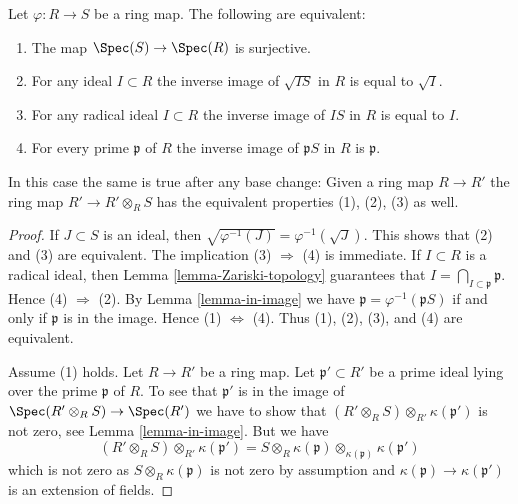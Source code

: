 \begin{lemma}
\label{lemma-surjective-spec-radical-ideal}
Let $\varphi : R \to S$ be a ring map.
The following are equivalent:
\begin{enumerate}
\item The map $\Spec(S) \to \Spec(R)$ is surjective.
\item For any ideal $I \subset R$
the inverse image of $\sqrt{IS}$ in $R$ is equal to $\sqrt{I}$.
\item For any radical ideal $I \subset R$ the inverse image
of $IS$ in $R$ is equal to $I$.
\item For every prime $\mathfrak p$ of $R$ the inverse
image of $\mathfrak p S$ in $R$ is $\mathfrak p$.
\end{enumerate}
In this case the same is true after any base change: Given a ring map
$R \to R'$ the ring map $R' \to R' \otimes_R S$ has the equivalent
properties (1), (2), (3) as well.
\end{lemma}

\begin{proof}
If $J \subset S$ is an ideal, then
$\sqrt{\varphi^{-1}(J)} = \varphi^{-1}(\sqrt{J})$. This shows that (2)
and (3) are equivalent.
The implication (3) $\Rightarrow$ (4) is immediate.
If $I \subset R$ is a radical ideal, then
Lemma \ref{lemma-Zariski-topology}
guarantees that $I = \bigcap_{I \subset \mathfrak p} \mathfrak p$.
Hence (4) $\Rightarrow$ (2). By
Lemma \ref{lemma-in-image}
we have $\mathfrak p = \varphi^{-1}(\mathfrak p S)$ if and only if
$\mathfrak p$ is in the image. Hence (1) $\Leftrightarrow$ (4).
Thus (1), (2), (3), and (4) are equivalent.

\medskip\noindent
Assume (1) holds. Let $R \to R'$ be a ring map. Let
$\mathfrak p' \subset R'$ be a prime ideal lying over the prime
$\mathfrak p$ of $R$. To see that $\mathfrak p'$ is in the image
of $\Spec(R' \otimes_R S) \to \Spec(R')$ we have to show
that $(R' \otimes_R S) \otimes_{R'} \kappa(\mathfrak p')$ is not zero, see
Lemma \ref{lemma-in-image}.
But we have
$$
(R' \otimes_R S) \otimes_{R'} \kappa(\mathfrak p') =
S \otimes_R \kappa(\mathfrak p)
\otimes_{\kappa(\mathfrak p)} \kappa(\mathfrak p')
$$
which is not zero as $S \otimes_R \kappa(\mathfrak p)$ is not zero
by assumption and $\kappa(\mathfrak p) \to \kappa(\mathfrak p')$ is
an extension of fields.
\end{proof}